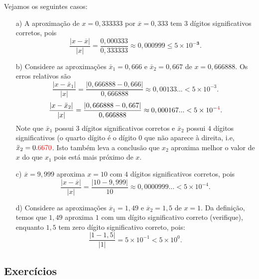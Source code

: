 \begin{ex} Vejamos os seguintes casos:
\begin{itemize}
\item[a)] A aproximação de $x=0,333333$ por $\overline{x}=0,333$ tem $3$ dígitos significativos corretos, pois
  \begin{equation}
    \frac{|x-\overline{x}|}{|x|} = \frac{0,000333}{0,333333} \approx 0,000999 \leq 5\times 10^{-\pmb{3}}.
  \end{equation}
\item[b)] Considere as aproximações $\bar{x}_1=0,666$ e $\bar{x}_2=0,667$ de $x=0,666888$. Os erros relativos são
  \begin{equation}
    \frac{|x-\bar{x}_1|}{|x|} = \frac{|0,666888-0,666|}{0,666888} \approx 0,00133...< 5\times 10^{-3}.
  \end{equation}
  \begin{equation}
    \frac{|x-\bar{x}_2|}{|x|} = \frac{|0,666888-0,667|}{0,666888} \approx 0,000167...< 5\times 10^{-{\color{red}{4}}}.
  \end{equation}
  Note que $\bar{x}_1$ possui $3$ dígitos significativos corretos e $\bar{x}_2$ possui $4$ dígitos significativos (o quarto dígito é o dígito $0$ que não aparece à direita, i.e, $\bar{x}_2=0.{\color{red}{6670}}$. Isto também leva a conclusão que $x_2$ aproxima melhor o valor de $x$ do que $x_1$ pois está mais próximo de $x$.

\item[c)] $\overline{x} = 9,999$ aproxima $x = 10$ com $4$ dígitos significativos corretos, pois
  \begin{equation}
    \frac{|x-\overline{x}|}{|x|} = \frac{|10 - 9,999|}{10} \approx 0,0000999...< 5\times 10^{-4}.
  \end{equation}
\item[d)] Considere as aproximações $\overline{x}_1 = 1,49$ e $\overline{x}_2 = 1,5$ de $x = 1$. Da definição, temos que $1,49$ aproxima $1$ com um dígito significativo correto (verifique), enquanto $1,5$ tem zero dígito significativo correto, pois:
  \begin{equation}
    \frac{|1-1,5|}{|1|} = 5\times 10^{-1} < 5\times 10^{0}.
  \end{equation}
\end{itemize}
\end{ex}

\subsection*{Exercícios}

